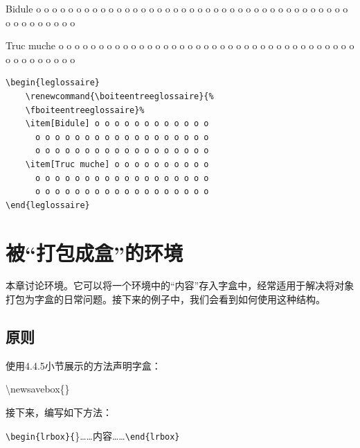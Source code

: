\begin{codelist}[]{
    \begin{leglossaire}
        \renewcommand{\boiteentreeglossaire}{%
        \fboiteentreeglossaire}%
        \item[Bidule] o o o o o o o o o o o o
          o o o o o o o o o o o o o o o o o o
          o o o o o o o o o o o o o o o o o o
        \item[Truc muche] o o o o o o o o o o
          o o o o o o o o o o o o o o o o o o
          o o o o o o o o o o o o o o o o o o
    \end{leglossaire}
}\begin{verbatim}
\begin{leglossaire}
    \renewcommand{\boiteentreeglossaire}{%
    \fboiteentreeglossaire}% 
    \item[Bidule] o o o o o o o o o o o o
      o o o o o o o o o o o o o o o o o o
      o o o o o o o o o o o o o o o o o o
    \item[Truc muche] o o o o o o o o o o
      o o o o o o o o o o o o o o o o o o
      o o o o o o o o o o o o o o o o o o
\end{leglossaire}
\end{verbatim}
\end{codelist}

\section{被“打包成盒”的环境}

本章讨论环境。它可以将一个环境中的“内容”存入字盒中，经常适用于解决将对象打包为字盒的日常问题。接下来的例子中，我们会看到如何使用这种结构。

\subsection{原则}

使用4.4.5小节展示的方法声明字盒：

\begin{dmd}
\backslash newsavebox\{\}
\end{dmd}

接下来，编写如下方法：

\begin{dmd}
\verb|\begin{lrbox}{|\}……内容……\verb|\end{lrbox}|
\end{dmd}


